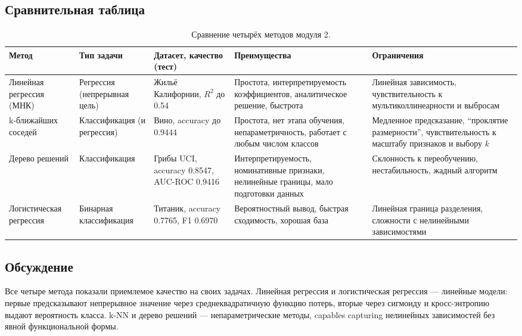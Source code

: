 \documentclass[12pt,a4paper]{article}
\begin{document}
\subsection{Сравнительная таблица}
\begin{table}[H]
\centering
\caption{Сравнение четырёх методов модуля 2.}
\label{tab:compare}
\small
\begin{tabularx}{\linewidth}{>{\raggedright\arraybackslash}p{2.2cm}>{\raggedright\arraybackslash}X>{\raggedright\arraybackslash}p{3.6cm}>{\raggedright\arraybackslash}X>{\raggedright\arraybackslash}X}
\toprule
Метод & Тип задачи & Датасет, качество (тест) & Преимущества & Ограничения \\
\midrule
Линейная регрессия (МНК) & Регрессия (непрерывная цель) & Жильё Калифорнии, $R^2$ до 0.54 & Простота, интерпретируемость коэффициентов, аналитическое решение, быстрота & Линейная зависимость, чувствительность к мультиколлинеарности и выбросам \\
k-ближайших соседей & Классификация (и регрессия) & Вино, accuracy до 0.9444 & Простота, нет этапа обучения, непараметричность, работает с любым числом классов & Медленное предсказание, ``проклятие размерности'', чувствительность к масштабу признаков и выбору $k$ \\
Дерево решений & Классификация & Грибы UCI, accuracy 0.8547, AUC-ROC 0.9416 & Интерпретируемость, номинативные признаки, нелинейные границы, мало подготовки данных & Склонность к переобучению, нестабильность, жадный алгоритм \\
Логистическая регрессия & Бинарная классификация & Титаник, accuracy 0.7765, F1 0.6970 & Вероятностный вывод, быстрая сходимость, хорошая база & Линейная граница разделения, сложности с нелинейными зависимостями \\
\bottomrule
\end{tabularx}
\end{table}

\subsection{Обсуждение}
Все четыре метода показали приемлемое качество на своих задачах. Линейная регрессия и логистическая регрессия --- линейные модели: первые предсказывают непрерывное значение через среднеквадратичную функцию потерь, вторые через сигмоиду и кросс-энтропию выдают вероятность класса. k-NN и дерево решений --- непараметрические методы, capables capturing нелинейных зависимостей без явной функциональной формы.
\end{document}
